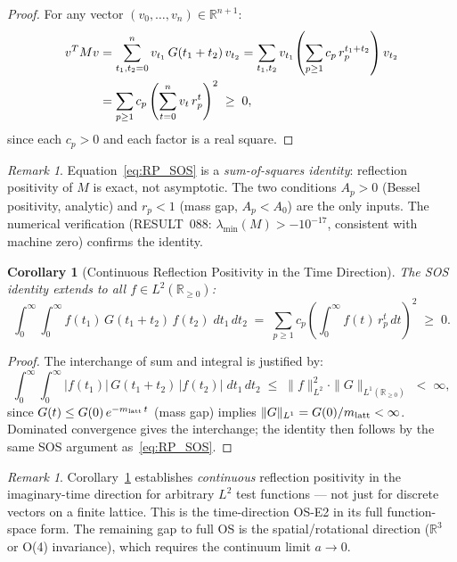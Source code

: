 \documentclass[12pt]{article}
\newtheorem{corollary}[theorem]{Corollary}
\theoremstyle{definition}
\theoremstyle{remark}
\newtheorem{remark}[theorem]{Remark}
\begin{document}
\begin{proof}
For any vector $(v_0, \ldots, v_n) \in \mathbb{R}^{n+1}$:
\begin{align}
v^T M v
&= \sum_{t_1,t_2=0}^n v_{t_1}\,G(t_1+t_2)\,v_{t_2}
= \sum_{t_1,t_2} v_{t_1}\!\left(\sum_{p\geq 1} c_p\,r_p^{t_1+t_2}\right)v_{t_2} \notag\\
&= \sum_{p\geq 1} c_p \left(\sum_{t=0}^n v_t\,r_p^t\right)^2
\;\geq\; 0,\label{eq:RP_SOS}
\end{align}
since each $c_p > 0$ and each factor is a real square.
\end{proof}

\begin{remark}
Equation~\eqref{eq:RP_SOS} is a \emph{sum-of-squares identity}:
reflection positivity of $M$ is exact, not asymptotic.
The two conditions $A_p > 0$ (Bessel positivity, analytic) and $r_p < 1$
(mass gap, $A_p < A_0$) are the only inputs.
The numerical verification (RESULT~088: $\lambda_{\min}(M) > -10^{-17}$,
consistent with machine zero) confirms the identity.
\end{remark}

\begin{corollary}[Continuous Reflection Positivity in the Time Direction]
\label{cor:rp_continuous}
The SOS identity extends to all $f \in L^2(\mathbb{R}_{\geq 0})$:
\[
\int_0^\infty\!\!\int_0^\infty f(t_1)\,G(t_1+t_2)\,f(t_2)\;dt_1\,dt_2
\;=\;
\sum_{p\geq 1} c_p\!\left(\int_0^\infty f(t)\,r_p^t\,dt\right)^{\!2}
\;\geq\; 0.
\]
\end{corollary}

\begin{proof}
The interchange of sum and integral is justified by:
\[
\int_0^\infty\!\!\int_0^\infty |f(t_1)|\,G(t_1+t_2)\,|f(t_2)|\;dt_1\,dt_2
\;\leq\;
\|f\|_{L^2}^2 \cdot \|G\|_{L^1(\mathbb{R}_{\geq 0})}
\;<\; \infty,
\]
since $G(t) \leq G(0)\,e^{-m_{\rm latt}\,t}$ (mass gap) implies
$\|G\|_{L^1} = G(0)/m_{\rm latt} < \infty$.
Dominated convergence gives the interchange;
the identity then follows by the same SOS argument as~\eqref{eq:RP_SOS}.
\end{proof}

\begin{remark}
Corollary~\ref{cor:rp_continuous} establishes \emph{continuous} reflection
positivity in the imaginary-time direction for arbitrary $L^2$ test functions ---
not just for discrete vectors on a finite lattice.
This is the time-direction OS-E2 in its full function-space form.
The remaining gap to full OS is the spatial/rotational direction
($\mathbb{R}^3$ or O(4) invariance), which requires the continuum limit $a\to 0$.
\end{remark}
\end{document}

